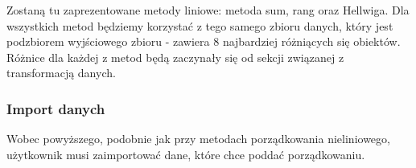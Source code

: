 \documentclass[12pt,a4paper]{report}
\begin{document}
{Zostaną tu zaprezentowane metody liniowe: metoda sum, rang oraz Hellwiga. Dla wszystkich metod będziemy korzystać z tego samego zbioru danych, który jest podzbiorem wyjściowego zbioru - zawiera 8 najbardziej różniących się obiektów. Różnice dla każdej z metod będą zaczynały się od sekcji związanej z transformacją danych. 

\subsubsection{Import danych}\label{import-danych}
Wobec powyższego, podobnie jak przy metodach porządkowania nieliniowego, użytkownik musi zaimportować dane, które chce poddać porządkowaniu. 


\begin{Shaded}
\begin{Highlighting}[]
\StringTok{ }\NormalTok{(}\NormalTok{, }
                            \NormalTok{, } \NormalTok{(}\NormalTok{,}\NormalTok{, }
                           \NormalTok{, }\NormalTok{, }\NormalTok{, }\NormalTok{,                                                                              }\NormalTok{,}\NormalTok{, }\NormalTok{, }\NormalTok{, }
                              \NormalTok{, }\NormalTok{, }\NormalTok{,  }\NormalTok{, }
                              \NormalTok{, }\NormalTok{, }\NormalTok{, }\NormalTok{,}\NormalTok{, }
                                  \NormalTok{, }\NormalTok{, }\NormalTok{, }\NormalTok{, }
                                   \NormalTok{, }\NormalTok{, }\NormalTok{,                                                                              }\NormalTok{, }
                                   \NormalTok{, }\NormalTok{, }\NormalTok{))}
\end{Highlighting}
\end{Shaded}



}
\end{document}

